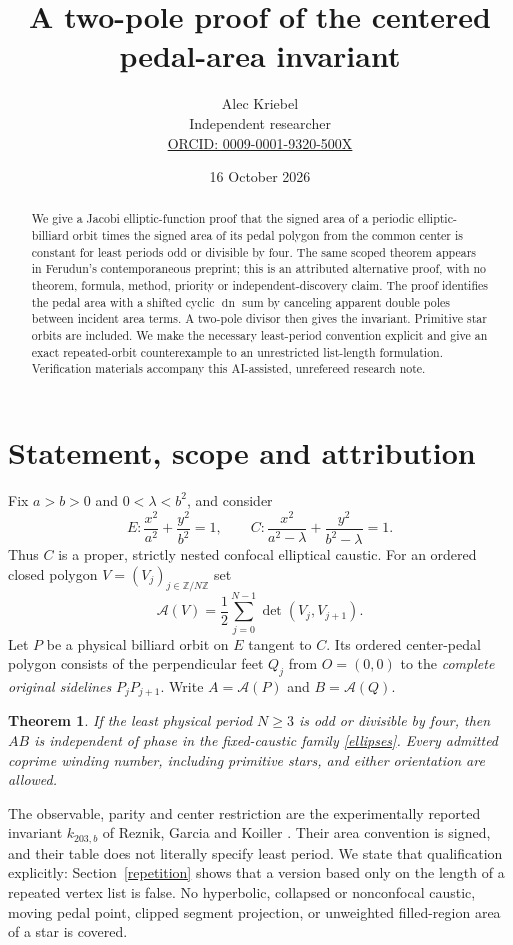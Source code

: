 \documentclass[11pt]{article}
\title{A two-pole proof of the centered pedal-area invariant}
\author{Alec Kriebel\\\small Independent researcher\\
\small\href{https://orcid.org/0009-0001-9320-500X}{ORCID: 0009-0001-9320-500X}}
\date{16 October 2026}
\newtheorem{theorem}{Theorem}
\newcommand{\dn}{\operatorname{dn}}
\newcommand{\Area}{\mathcal A}
\begin{document}
\maketitle
\begin{abstract}
We give a Jacobi elliptic-function proof that the signed area of a periodic
elliptic-billiard orbit times the signed area of its pedal polygon from the
common center is constant for least periods odd or divisible by four.
The same scoped theorem appears in Ferudun's contemporaneous preprint;
this is an attributed alternative proof, with no theorem, formula, method,
priority or independent-discovery claim. The proof identifies the pedal
area with a shifted cyclic $\dn$ sum by canceling apparent double poles
between incident area terms. A two-pole divisor then gives the invariant.
Primitive star orbits are included. We make the necessary least-period
convention explicit and give an exact repeated-orbit counterexample to an
unrestricted list-length formulation. Verification materials accompany this
AI-assisted, unrefereed research note.
\end{abstract}

\section{Statement, scope and attribution}
Fix $a>b>0$ and $0<\lambda<b^2$, and consider
\begin{equation}\label{ellipses}
 E:\frac{x^2}{a^2}+\frac{y^2}{b^2}=1,
 \qquad C:\frac{x^2}{a^2-\lambda}+\frac{y^2}{b^2-\lambda}=1.
\end{equation}
Thus $C$ is a proper, strictly nested confocal elliptical caustic. For an
ordered closed polygon $V=(V_j)_{j\in\mathbb Z/N\mathbb Z}$ set
\[
 \Area(V)=\frac12\sum_{j=0}^{N-1}\det(V_j,V_{j+1}).
\]
Let $P$ be a physical billiard orbit on $E$ tangent to $C$. Its ordered
center-pedal polygon consists of the perpendicular feet $Q_j$ from
$O=(0,0)$ to the \emph{complete original sidelines} $P_jP_{j+1}$.
Write $A=\Area(P)$ and $B=\Area(Q)$.

\begin{theorem}\label{main}
If the least physical period $N\geq3$ is odd or divisible by four, then
$AB$ is independent of phase in the fixed-caustic family
\eqref{ellipses}. Every admitted coprime winding number, including
primitive stars, and either orientation are allowed.
\end{theorem}

The observable, parity and center restriction are the experimentally
reported invariant $k_{203,b}$ of Reznik, Garcia and Koiller
\cite[Table~3]{RGK,RGKarxiv}. Their area convention is signed, and
their table does not literally specify least period. We state that
qualification explicitly: Section~\ref{repetition} shows that a version
based only on the length of a repeated vertex list is false. No
hyperbolic, collapsed or nonconfocal caustic, moving pedal point, clipped
segment projection, or unweighted filled-region area of a star is covered.
\end{document}
